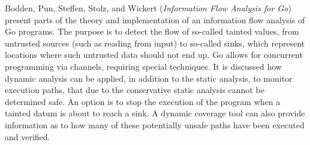 

Bodden, Pun, Steffen, Stolz, and Wickert
\cite{isola-2016-bodden}
({\em Information Flow Analysis for Go})
present parts of the theory and implementation of 
an information flow analysis of Go programs. The purpose is
to detect the flow of so-called tainted values, from untrusted sources (such as reading from input) to so-called sinks, 
which represent locations where such untrusted data should not end up.  Go allows for concurrent programming via channels, requiring
special techniques. It is discussed how dynamic analysis can be
applied, in addition to the  static analysis, to monitor execution paths, that due to the conservative static analysis cannot be determined safe. An option is to stop the execution of
the program when a tainted datum is about to reach a sink.
A dynamic coverage tool can also provide information
as to how many of these potentially unsafe paths have been executed and verified.

